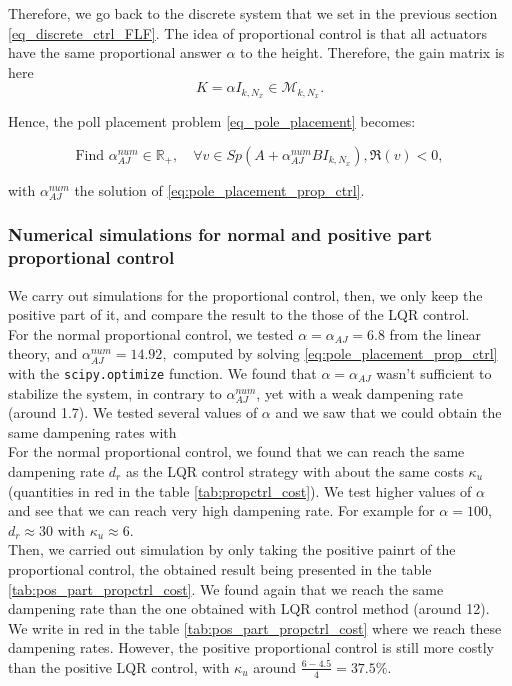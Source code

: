 \documentclass[12pt]{article}
\begin{document}
Therefore, we go back to the discrete system that we set in the previous section \eqref{eq_discrete_ctrl_FLF}. The idea of proportional control is that all actuators have the same proportional answer $\alpha$ to the height. Therefore, the gain matrix is here 
\begin{equation}
    K = \alpha I_{k, N_x} \in \mathcal{M}_{k,N_x}.
\end{equation}

Hence, the poll placement problem \eqref{eq_pole_placement} becomes: 


\begin{equation}\label{eq:pole_placement_prop_ctrl}
\boxed{
    \text{Find }\alpha^{num}_{AJ} \in \mathbb{R}_+,  \quad \forall v \in Sp(A+\alpha^{num}_{AJ} BI_{k, N_x}), \mathfrak{R}(v) <0,
    }
\end{equation}

with $\alpha_{AJ}^{num}$ the solution of \eqref{eq:pole_placement_prop_ctrl}.


\subsubsection{Numerical simulations for normal and positive part proportional control}
We carry out simulations for the proportional control, then, we only keep the positive part of it, and
compare the result to the those of the LQR control.
\\


For the normal proportional control, we tested $\alpha = \alpha_{AJ}= 6.8$ from the linear theory, 
and $\alpha^{num}_{AJ} = 14.92,$ computed by solving \eqref{eq:pole_placement_prop_ctrl} with the
 \texttt{scipy.optimize} function. We found that $\alpha = \alpha_{AJ}$ wasn't sufficient 
to stabilize the system, in contrary to $\alpha_{AJ}^{num}$, yet with a weak dampening rate (around 1.7).
We tested several values of $\alpha$ and we saw that we could obtain the same dampening rates with 
\\

For the normal proportional control, we found that we can reach the same dampening rate $d_r$ as the LQR control
strategy with about the same costs $\kappa_u$ (quantities in red in the table \eqref{tab:propctrl_cost}). We test higher values
of $\alpha$ and see that we can reach very high dampening rate. For example for $\alpha = 100$, $d_r \approx 30$ 
with $\kappa_u \approx 6$.
\\

Then, we carried out simulation by only taking the positive painrt of the proportional control, the obtained result
being presented in the table \eqref{tab:pos_part_propctrl_cost}. We found again that we reach the same dampening rate than
the one obtained with LQR control method (around 12). We write in red in the table \eqref{tab:pos_part_propctrl_cost} where
we reach these dampening rates. However, the positive proportional control is still more costly than the 
positive LQR control, with $\kappa_u$ around $\frac{6-4.5}{4}= 37.5 \%$.
\end{document}

